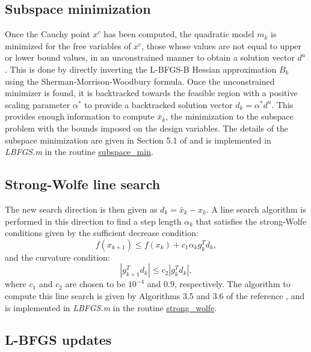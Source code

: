 \documentclass[11pt]{article}
\begin{document}
\subsection{Subspace minimization}

Once the Cauchy point $x^c$ has been computed, the
quadratic model $m_k$ is minimized for the free
variables of $x^c$, those whose values are not equal to upper
or lower bound values, in an unconstrained manner to
obtain a solution vector $d^u$. This is done by directly
inverting the L-BFGS-B Hessian approximation $B_k$ using
the Sherman-Morrison-Woodbury formula. Once the unconstrained minimizer
is found, it is backtracked towards the feasible region with a
positive scaling parameter $\alpha^*$ to provide a backtracked solution
vector $d_k = \alpha^* d^u$. This provides enough information to compute
$\bar{x}_k$, the minimization to the subspace problem with
the bounds imposed on the design variables.
The details of the subspace minimization
are given in Section 5.1 of \cite{lbfgsb} and is implemented
in \emph{LBFGS.m} in the routine
\href{https://github.com/bgranzow/L-BFGS-B/blob/master/LBFGSB.m#L358}
{subspace\_min}.

\subsection{Strong-Wolfe line search}

The new search direction is then given as $d_k = \bar{x}_k - x_k$.
A line search algorithm is performed in this direction to find
a step length $\alpha_k$ that satisfies the strong-Wolfe
conditions given by the sufficient decrease condition:
%
\begin{equation}
f(x_{k+1}) \leq f(x_k) + c_1 \alpha_k g_k^T d_k,
\end{equation}
%
and the curvature condition:
%
\begin{equation}
| g^T_{k+1}  d_k | \leq c_2 | g^T_k d_k |,
\end{equation}
%
where $c_1$ and $c_2$ are chosen to be $10^{-4}$ and
$0.9$, respectively.
The algorithm to compute this line search is given
by Algorithms 3.5 and 3.6 of the reference
\cite{optimization}, and is implemented in
\emph{LBFGS.m} in the routine
\href{https://github.com/bgranzow/L-BFGS-B/blob/master/LBFGSB.m#L427}
{strong\_wolfe}.

\subsection{L-BFGS updates}
\end{document}
